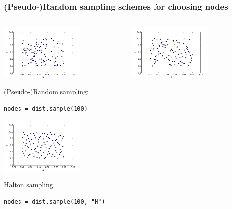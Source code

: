 \documentclass{beamer}
\begin{document}
  \begin{frame}[fragile]
 \frametitle{(Pseudo-)Random sampling schemes for choosing nodes}
 \begin{columns}
     \begin{center}
                \includegraphics[width=0.65\textwidth]{samples.png}

                (Pseudo-)Random sampling:

                \scriptsize
                \verb;nodes = dist.sample(100);
                \normalsize

                \includegraphics[width=0.65\textwidth]{samples_H.png}

                Halton sampling

                \scriptsize
                \verb;nodes = dist.sample(100, "H");
                \normalsize

     \end{center}
     \begin{center}
                  \includegraphics[width=0.65\textwidth]{samples_L.png}


\end{center}
\end{columns}
\end{frame}
\end{document}
